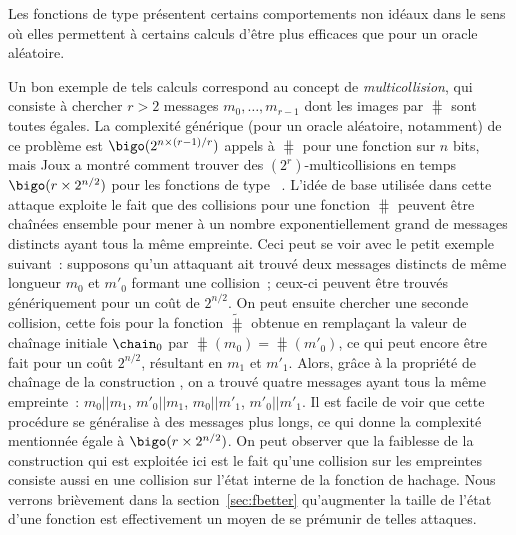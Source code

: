 Les fonctions de type \merkdam présentent certains comportements non idéaux dans le sens où elles permettent à certains calculs
d'être plus efficaces que pour un oracle aléatoire.

Un bon exemple de tels calculs correspond au concept de 
\emph{multicollision}, qui consiste à chercher $r > 2$ messages $m_{0},\ldots,m_{r-1}$ dont les images par $\hash$
sont toutes égales.
La complexité générique (pour un oracle aléatoire, notamment) de ce problème est
$\bigo(2^{n\times (r-1)/r})$ appels à $\hash$ pour une fonction sur $n$ bits, mais
Joux a montré comment trouver
des $(2^r)$-multicollisions en temps $\bigo(r\times 2^{n/2})$ pour les fonctions de type \merkdam~\cite{DBLP:conf/crypto/Joux04}.
L'idée de base utilisée dans cette attaque exploite le fait que des collisions pour une fonction \merkdam $\hash$ peuvent être chaînées
ensemble pour mener à un nombre exponentiellement grand de messages distincts ayant tous la même empreinte.
Ceci peut se voir avec le petit exemple suivant~: supposons qu'un attaquant ait trouvé deux messages distincts
de même longueur $m_0$ et $m'_0$ formant une collision~; ceux-ci peuvent être trouvés génériquement
pour un coût de
$2^{n/2}$. On peut ensuite chercher une seconde collision, cette fois pour la fonction $\widetilde \hash$ obtenue en remplaçant la valeur de chaînage initiale
$\chain_0$ par $\hash(m_0) = \hash(m'_0)$, ce qui peut encore être fait pour un coût $2^{n/2}$, résultant en $m_1$ et $m'_1$.
Alors, grâce à la propriété de chaînage de la construction \merkdam, on a trouvé quatre messages ayant tous la même empreinte~:
$m_0||m_1$, $m'_0||m_1$, $m_0||m'_1$, $m'_0||m'_1$. 
Il est facile de voir que cette procédure se généralise à des messages plus longs, ce qui donne la complexité mentionnée égale à
$\bigo(r \times 2^{n/2})$.
On peut observer que la faiblesse de la construction qui est exploitée ici est le fait qu'une collision
sur les empreintes consiste aussi en une collision sur l'état interne de la fonction de hachage.
Nous verrons brièvement dans la section~\ref{sec:fbetter} qu'augmenter la taille de l'état d'une fonction
est effectivement un moyen de se prémunir de telles attaques.

